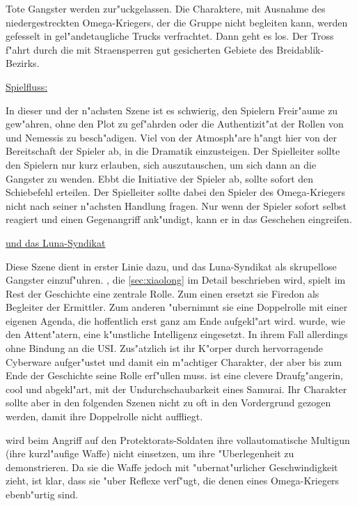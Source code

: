Tote Gangster werden zur"uckgelassen. Die Charaktere, mit Ausnahme des niedergestreckten Omega-Kriegers, der die Gruppe nicht begleiten kann, werden gefesselt in gel"andetaugliche Trucks verfrachtet. Dann geht es los. Der Tross f"ahrt durch die mit Stra\3ensperren gut gesicherten Gebiete des Breidablik-Bezirks.

\vfill

\begin{remarks}
	\underline{Spielfluss:}

	In dieser und der n"achsten Szene ist es schwierig, den Spielern Freir"aume zu gew"ahren, ohne den Plot zu gef"ahrden oder die Authentizit"at der Rollen von \xl{} und Nemessis zu besch"adigen. Viel von der Atmosph"are h"angt hier von der Bereitschaft der Spieler ab, in die Dramatik einzusteigen. Der Spielleiter sollte den Spielern nur kurz erlauben, sich auszutauschen, um sich dann an die Gangster zu wenden. Ebbt die Initiative der Spieler ab, sollte \xl{} sofort den Schie\3befehl erteilen. Der Spielleiter sollte dabei den Spieler des Omega-Kriegers nicht nach seiner n"achsten Handlung fragen. Nur wenn der Spieler sofort selbst reagiert und einen Gegenangriff ank"undigt, kann er in das Geschehen eingreifen.

	\underline{\xl{} und das Luna-Syndikat}

	Diese Szene dient in erster Linie dazu, \xl{} und das Luna-Syndikat als skrupellose Gangster einzuf"uhren. \xl{}, die  \cref{sec:xiaolong} im Detail beschrieben wird, spielt im Rest der Geschichte eine zentrale Rolle. Zum einen ersetzt sie Firedon als Begleiter der Ermittler. Zum anderen "ubernimmt sie eine Doppelrolle mit einer eigenen Agenda, die hoffentlich erst ganz am Ende aufgekl"art wird. \xl{} wurde, wie den Attent"atern, eine k"unstliche Intelligenz eingesetzt. In ihrem Fall allerdings ohne Bindung an die USI. Zus"atzlich ist ihr K"orper durch hervorragende Cyberware aufger"ustet und damit ein m"achtiger Charakter, der aber bis zum Ende der Geschichte seine Rolle erf"ullen muss. \xl{} ist eine clevere Draufg"angerin, cool und abgekl"art, mit der Undurchschaubarkeit eines Samurai. Ihr Charakter sollte aber in den folgenden Szenen nicht zu oft in den Vordergrund gezogen werden, damit ihre Doppelrolle nicht auffliegt.

	\xl{} wird beim Angriff auf den Protektorats-Soldaten ihre vollautomatische Multigun (ihre kurzl"aufige Waffe) nicht einsetzen, um ihre "Uberlegenheit zu demonstrieren. Da sie die Waffe jedoch mit "ubernat"urlicher Geschwindigkeit zieht, ist klar, dass sie "uber Reflexe verf"ugt, die denen eines Omega-Kriegers ebenb"urtig sind.
\end{remarks}

